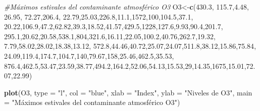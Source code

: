 \documentclass[
  oneside]{book}
\newenvironment{Shaded}{\begin{snugshade}}{\end{snugshade}}
\newcommand{\AttributeTok}[1]{\textcolor[rgb]{0.13,0.29,0.53}{#1}}
\newcommand{\CommentTok}[1]{\textcolor[rgb]{0.56,0.35,0.01}{\textit{#1}}}
\newcommand{\DecValTok}[1]{\textcolor[rgb]{0.00,0.00,0.81}{#1}}
\newcommand{\FloatTok}[1]{\textcolor[rgb]{0.00,0.00,0.81}{#1}}
\newcommand{\FunctionTok}[1]{\textcolor[rgb]{0.13,0.29,0.53}{\textbf{#1}}}
\newcommand{\NormalTok}[1]{#1}
\newcommand{\OtherTok}[1]{\textcolor[rgb]{0.56,0.35,0.01}{#1}}
\newcommand{\StringTok}[1]{\textcolor[rgb]{0.31,0.60,0.02}{#1}}
\begin{document}
\begin{Shaded}
\begin{Highlighting}[]
\CommentTok{\#Máximos estivales del contaminante atmosférico O3}
\NormalTok{O3}\OtherTok{\textless{}{-}}\FunctionTok{c}\NormalTok{(}\FloatTok{430.3}\NormalTok{, }\FloatTok{115.7}\NormalTok{,}\FloatTok{4.48}\NormalTok{, }\FloatTok{26.95}\NormalTok{, }\FloatTok{72.27}\NormalTok{,}\FloatTok{206.4}\NormalTok{, }\FloatTok{22.79}\NormalTok{,}\FloatTok{25.03}\NormalTok{,}\FloatTok{226.8}\NormalTok{,}\FloatTok{11.1}\NormalTok{,}\DecValTok{1572}\NormalTok{,}\DecValTok{100}\NormalTok{,}\FloatTok{104.5}\NormalTok{,}\FloatTok{37.1}\NormalTok{,}
      \FloatTok{20.22}\NormalTok{,}\FloatTok{106.9}\NormalTok{,}\FloatTok{47.2}\NormalTok{,}\FloatTok{62.82}\NormalTok{,}\FloatTok{39.3}\NormalTok{,}\FloatTok{18.52}\NormalTok{,}\FloatTok{41.57}\NormalTok{,}\FloatTok{429.5}\NormalTok{,}\DecValTok{1228}\NormalTok{,}\FloatTok{127.6}\NormalTok{,}\FloatTok{9.93}\NormalTok{,}\FloatTok{90.4}\NormalTok{,}\FloatTok{201.7}\NormalTok{,}
      \FloatTok{295.1}\NormalTok{,}\FloatTok{20.62}\NormalTok{,}\FloatTok{20.58}\NormalTok{,}\FloatTok{538.1}\NormalTok{,}\DecValTok{804}\NormalTok{,}\FloatTok{321.6}\NormalTok{,}\FloatTok{16.11}\NormalTok{,}\FloatTok{22.05}\NormalTok{,}\FloatTok{100.2}\NormalTok{,}\FloatTok{40.76}\NormalTok{,}\FloatTok{262.7}\NormalTok{,}\FloatTok{19.32}\NormalTok{,}
\FloatTok{7.79}\NormalTok{,}\FloatTok{58.02}\NormalTok{,}\FloatTok{28.02}\NormalTok{,}\FloatTok{18.38}\NormalTok{,}\FloatTok{13.12}\NormalTok{,}
\FloatTok{572.8}\NormalTok{,}\FloatTok{44.46}\NormalTok{,}\FloatTok{40.72}\NormalTok{,}\FloatTok{25.07}\NormalTok{,}\FloatTok{24.07}\NormalTok{,}\FloatTok{511.8}\NormalTok{,}\FloatTok{38.12}\NormalTok{,}\FloatTok{15.86}\NormalTok{,}\FloatTok{75.84}\NormalTok{,}
\FloatTok{24.09}\NormalTok{,}\FloatTok{119.4}\NormalTok{,}\FloatTok{174.7}\NormalTok{,}\FloatTok{104.7}\NormalTok{,}\DecValTok{140}\NormalTok{,}\FloatTok{79.67}\NormalTok{,}\DecValTok{158}\NormalTok{,}\FloatTok{25.46}\NormalTok{,}\FloatTok{462.5}\NormalTok{,}\FloatTok{35.53}\NormalTok{,}
\FloatTok{876.4}\NormalTok{,}\FloatTok{462.5}\NormalTok{,}\FloatTok{53.47}\NormalTok{,}\FloatTok{23.59}\NormalTok{,}\FloatTok{38.77}\NormalTok{,}\FloatTok{494.2}\NormalTok{,}\FloatTok{164.2}\NormalTok{,}\FloatTok{52.06}\NormalTok{,}\FloatTok{54.13}\NormalTok{,}\FloatTok{15.53}\NormalTok{,}\DecValTok{29}\NormalTok{,}\FloatTok{14.35}\NormalTok{,}\DecValTok{1675}\NormalTok{,}\FloatTok{15.01}\NormalTok{,}\FloatTok{72.07}\NormalTok{,}\FloatTok{22.99}\NormalTok{)}

\FunctionTok{plot}\NormalTok{(O3, }\AttributeTok{type =} \StringTok{"l"}\NormalTok{, }\AttributeTok{col =} \StringTok{"blue"}\NormalTok{, }\AttributeTok{xlab =} \StringTok{"Index"}\NormalTok{, }\AttributeTok{ylab =} \StringTok{"Niveles de O3"}\NormalTok{, }\AttributeTok{main =} \StringTok{"Máximos estivales del contaminante atmosférico O3"}\NormalTok{)}
\end{Highlighting}
\end{Shaded}
\end{document}
